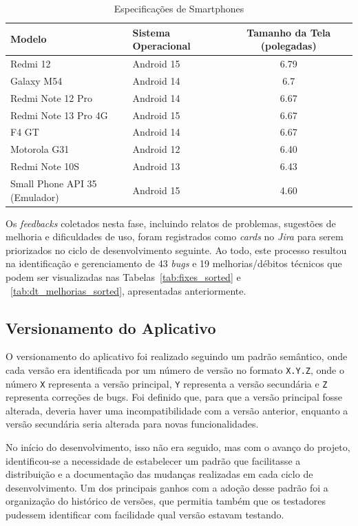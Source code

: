 \begin{table}[h!]
    \centering
    \caption{Especificações de Smartphones}
    \begin{tabular}{l l c}
    \toprule
    \textbf{Modelo} & \textbf{Sistema Operacional} & \textbf{Tamanho da Tela (polegadas)} \\
    \midrule
    Redmi 12 & Android 15 & 6.79 \\
    Galaxy M54 & Android 14 & 6.7 \\
    Redmi Note 12 Pro & Android 14 & 6.67 \\
    Redmi Note 13 Pro 4G & Android 15 & 6.67 \\
    F4 GT & Android 14 & 6.67 \\
    Motorola G31 & Android 12 & 6.40 \\
    Redmi Note 10S & Android 13 & 6.43 \\
    Small Phone API 35 (Emulador) & Android 15 & 4.60 \\
    \bottomrule
    \end{tabular}
    \label{tab:dispositivos-testados}
\end{table}

Os \textit{feedbacks} coletados nesta fase, incluindo relatos de problemas, sugestões de melhoria e dificuldades de uso, foram registrados como \textit{cards} no \textit{Jira} para serem priorizados no ciclo de desenvolvimento seguinte. Ao todo, este processo resultou na identificação e gerenciamento de 43 \textit{bugs} e 19 melhorias/débitos técnicos que podem ser visualizadas nas Tabelas~\ref{tab:fixes_sorted} e ~\ref{tab:dt_melhorias_sorted}, apresentadas anteriormente.

\subsection{Versionamento do Aplicativo}
\label{sec:versionamento}
O versionamento do aplicativo foi realizado seguindo um padrão semântico, onde cada versão era identificada por um número de versão no formato \texttt{X.Y.Z}, onde o número \texttt{X} representa a versão principal, \texttt{Y} representa a versão secundária e \texttt{Z} representa correções de bugs. Foi definido que, para que a versão principal fosse alterada, deveria haver uma incompatibilidade com a versão anterior,
enquanto a versão secundária seria alterada para novas funcionalidades.

No início do desenvolvimento, isso não era seguido, mas com o avanço do projeto, identificou-se a necessidade de estabelecer um padrão que facilitasse a distribuição e a documentação das mudanças realizadas em cada ciclo de desenvolvimento. Um dos principais ganhos com a adoção desse padrão foi a organização do histórico de versões, que permitia também que os testadores pudessem identificar com facilidade qual versão estavam testando.

